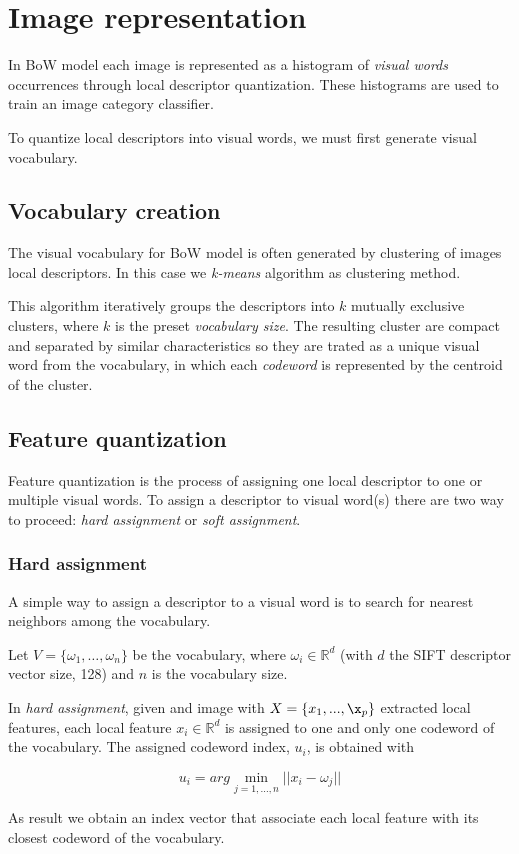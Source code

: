 \section{Image representation}

In BoW model each image is represented as a histogram of \emph{visual words} occurrences through local descriptor quantization\cite{DBLP:journals/corr/abs-1304-5168}. These histograms are used to train an image category classifier.

To quantize local descriptors into visual words, we must first generate visual vocabulary. 

\subsection{Vocabulary creation}

The visual vocabulary for BoW model is often generated by clustering of images local descriptors. In this case we \emph{k-means} algorithm as clustering method.

This algorithm iteratively groups the descriptors into $k$ mutually exclusive clusters, where $k$ is the preset \emph{vocabulary size}. The resulting cluster are compact and separated by similar characteristics so they are trated as a unique visual word from the vocabulary, in which each \emph{codeword} is represented by the centroid of the cluster.

\subsection{Feature quantization}

Feature quantization is the process of assigning one local descriptor to one or multiple
visual words. To assign a descriptor to visual word(s) there are two way to proceed: \emph{hard assignment} or \emph{soft assignment}.

\subsubsection{Hard assignment}

A simple way to assign a descriptor to a visual word is to search for nearest neighbors among the vocabulary.

Let $V = \{\omega_1, \ldots, \omega_n \}$ be the vocabulary, where $\omega_i \in \mathbb{R}^{d}$ (with $d$ the SIFT descriptor vector size, 128) and $n$ is the vocabulary size.

In \emph{hard assignment}, given and image with $X = \{x_1, ..., \x_p\}$ extracted local features, each local feature $x_i \in \mathbb{R}^{d}$ is assigned to one and only one codeword of the vocabulary. The assigned codeword index, $u_i$, is obtained with

$$u_i = arg \min_{j = 1, \ldots, n} ||x_i - \omega_j||$$

As result we obtain an index vector that associate each local feature with its closest codeword of the vocabulary.

